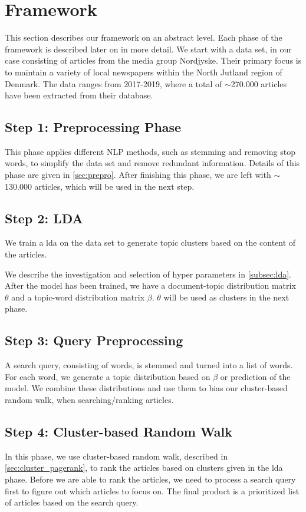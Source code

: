 \section{Framework}\label{sec:framework}
This section describes our framework on an abstract level.
Each phase of the framework is described later on in more detail. 
We start with a data set, in our case consisting of articles from the media group Nordjyske. Their primary focus is to maintain a variety of local newspapers within the North Jutland region of Denmark. 
The data ranges from 2017-2019, where a total of $\sim$270.000 articles have been extracted from their database.

\subsection*{Step 1: Preprocessing Phase}
This phase applies different \gls{NLP} methods, such as stemming and removing stop words, to simplify the data set and remove redundant information.
Details of this phase are given in \autoref{sec:prepro}.
After finishing this phase, we are left with $\sim$130.000 articles, which will be used in the next step.

\subsection*{Step 2: LDA}
We train a \acrfull{lda} on the data set to generate topic clusters based on the content of the articles. 

We describe the investigation and selection of hyper parameters in \autoref{subsec:lda}. 
After the model has been trained, we have a document-topic distribution matrix $\theta$ and a topic-word distribution matrix $\beta$.
$\theta$ will be used as clusters in the next phase.

\subsection*{Step 3: Query Preprocessing}
A search query, consisting of words, is stemmed and turned into a list of words.
For each word, we generate a topic distribution based on $\beta$ or prediction of the model.
We combine these distributions and use them to bias our cluster-based random walk, when searching/ranking articles.


\subsection*{Step 4: Cluster-based Random Walk}
In this phase, we use cluster-based random walk, described in \autoref{sec:cluster_pagerank}, to rank the articles based on clusters given in the \gls{lda} phase.
Before we are able to rank the articles, we need to process a search query first to figure out which articles to focus on.
The final product is a prioritized list of articles based on the search query.


%
